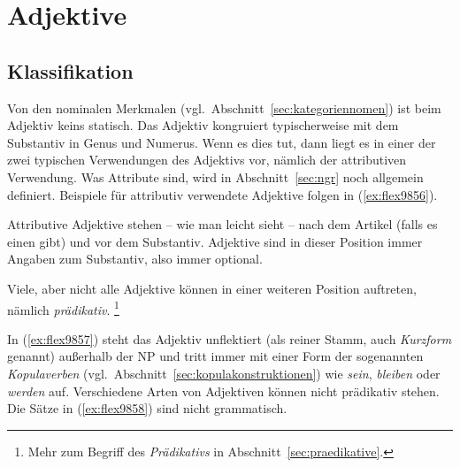 \section{Adjektive}

\label{sec:adjektive}

\subsection{Klassifikation}

\label{sec:adjektivklassifikation}


Von den nominalen Merkmalen (vgl.\ Abschnitt~\ref{sec:kategoriennomen}) ist beim Adjektiv keins statisch.
Das Adjektiv kongruiert typischerweise mit dem Substantiv in Genus und Numerus.
Wenn es dies tut, dann liegt es in einer der zwei typischen Verwendungen des Adjektivs vor, nämlich der attributiven Verwendung.
Was Attribute sind, wird in Abschnitt~\ref{sec:ngr} noch allgemein definiert.
Beispiele für attributiv verwendete Adjektive folgen in (\ref{ex:flex9856}).


\begin{exe}
  \ex \label{ex:flex9856}
  \begin{xlist}
  \end{xlist}
\end{exe}

Attributive Adjektive stehen -- wie man leicht sieht -- nach dem Artikel (falls es einen gibt) und vor dem Substantiv.
Adjektive sind in dieser Position immer Angaben zum Substantiv, also immer optional.

Viele, aber nicht alle Adjektive können in einer weiteren Position auftreten, nämlich \textit{prädikativ}.%
\footnote{Mehr zum Begriff des \textit{Prädikativs} in Abschnitt~\ref{sec:praedikative}.}

\begin{exe}
  \ex \label{ex:flex9857}
  \begin{xlist}
  \end{xlist}
\end{exe}

In (\ref{ex:flex9857}) steht das Adjektiv unflektiert (als reiner Stamm, auch \textit{Kurzform} genannt) außerhalb der NP und tritt immer mit einer Form der sogenannten \textit{Kopulaverben} (vgl.\ Abschnitt~\ref{sec:kopulakonstruktionen}) wie \textit{sein}, \textit{bleiben} oder \textit{werden} auf.
Verschiedene Arten von Adjektiven können nicht prädikativ stehen.
Die Sätze in (\ref{ex:flex9858}) sind nicht grammatisch.

